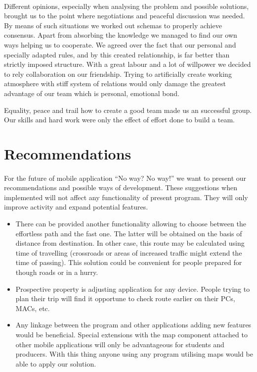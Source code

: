 \documentclass[12pt]{article}
\begin{document}
\paragraph{}
Different opinions, especially when analysing the problem and possible solutions, brought us to the point where negotiations and peaceful discussion was needed.
By means of such situations we worked out schemas to properly achieve consensus.
Apart from absorbing the knowledge we managed to find our own ways helping us to cooperate.
We agreed over the fact that our personal and specially adapted rules, and by this created relationship, is far better than strictly imposed structure.
With a great labour and a lot of willpower we decided to rely collaboration on our friendship.
Trying to artificially create working atmosphere with stiff system of relations would only damage the greatest advantage of our team which is personal, emotional bond.

Equality, peace and trail how to create a good team made us an successful group.
Our skills and hard work were only the effect of effort done to build a team.

\section{Recommendations}
\paragraph{}
 For the future of mobile application ``No way? No way!'' we want to present our recommendations and possible ways of development.
These suggestions when implemented will not affect any functionality of present program.
They will only improve activity and expand potential features.

\begin{itemize}
	\item There can be provided another functionality allowing to choose between the effortless path and the fast one.
	The latter will be obtained on the basis of distance from destination.
	In other case, this route may be calculated using time of travelling (crossroads or areas of increased traffic might extend the time of passing).
	This solution could be convenient for people prepared for though roads or in a hurry.
	
	\item Prospective property is adjusting application for any device.
	People trying to plan their trip will find it opportune to check route earlier on their PCs, MACs, etc.
	
	\item Any linkage between the program and other applications adding new features would be beneficial.
	Special extensions with the map component attached to other mobile applications will only be advantageous for students and producers.
	With this thing anyone using any program utilising maps would be able to apply our solution.
\end{itemize}
\end{document}
